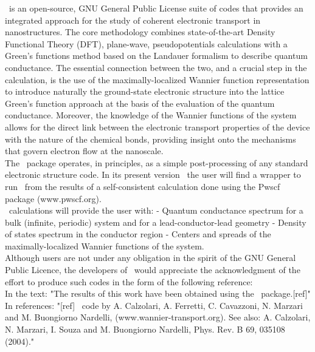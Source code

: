  \WANT\ is an open-source, GNU
General Public License suite of codes that provides an integrated
approach for the study of coherent electronic transport in
nanostructures. The core methodology combines state-of-the-art
Density Functional Theory (DFT), plane-wave, pseudopotentials
calculations with a Green's functions method based on the Landauer
formalism to describe quantum conductance. The essential
connection between the two, and a crucial step in the calculation,
is the use of the maximally-localized Wannier function
representation to introduce naturally the ground-state electronic
structure into the lattice Green's function approach at the basis
of the evaluation of the quantum conductance. Moreover, the
knowledge of the Wannier functions of the system allows for the
direct link between the electronic transport properties of the
device with the nature of the chemical bonds, providing insight
onto the mechanisms that
govern electron flow at the nanoscale.\\

\noindent The \WANT\ package operates, in principles, as a simple
post-processing of any standard electronic structure code. In its
present version \WANTVERSION\ the user will find a wrapper to run
\WANT\ from the results of a self-consistent calculation done
using the Pwscf package (www.pwscf.org).\\

\noindent \WANT\ calculations will provide the user with: -
Quantum conductance spectrum for a bulk (infinite, periodic)
system and for a lead-conductor-lead geometry - Density of states
spectrum in the conductor region - Centers and spreads of the
maximally-localized Wannier functions of the system.\\

\newpage
{} Although users are not under any
obligation in the spirit of the GNU General Public Licence, the
developers of \WANT\ would appreciate the acknowledgment of the
effort to produce such codes in the form of the following
reference:\\

\noindent In the text: "The results of this work have been
obtained using the \WANT\ package.[ref]"\\

\noindent In references: "[ref] \WANT\ code by A. Calzolari, A.
Ferretti, C. Cavazzoni, N. Marzari and M. Buongiorno Nardelli,
(www.wannier-transport.org). See also: A. Calzolari, N. Marzari,
I. Souza and M. Buongiorno Nardelli, Phys. Rev. B 69, 035108
(2004)."\\
  \vspace{0.25in}

